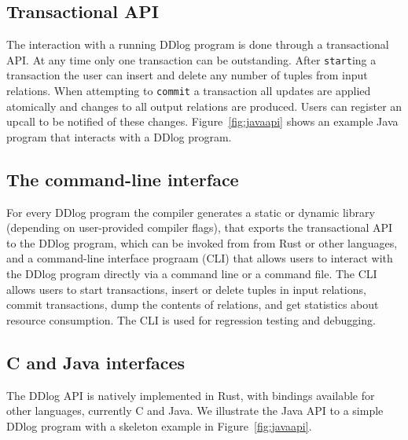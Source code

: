 \subsection{Transactional API}

The interaction with a running DDlog program is done through a
transactional API.  At any time only one transaction can be
outstanding.  After \texttt{start}ing a transaction the user can
insert and delete any number of tuples from input relations.  When
attempting to \texttt{commit} a transaction all updates are applied
atomically and changes to all output relations are produced.  Users
can register an upcall to be notified of these changes.
Figure~\ref{fig:javaapi}
shows an example Java program that interacts with a DDlog program.

\subsection{The command-line interface}

For every DDlog program the compiler generates a static or dynamic library
(depending on user-provided compiler flags), that exports the transactional API
to the DDlog program, which can be 
invoked from from Rust or other languages, and a
command-line interface prograam (CLI) that allows users to interact
with the DDlog program directly via a command line or a command file. 
The CLI allows users to start
transactions, insert or delete tuples in input relations, commit
transactions, dump the contents of relations, and get statistics
about resource consumption.  The CLI is used for regression testing
and debugging.

\subsection{C and Java interfaces}

The DDlog API is natively
implemented in Rust, with bindings available for other languages,
currently C and Java.
We illustrate the Java API to a simple DDlog program with a
skeleton example in Figure~\ref{fig:javaapi}.

